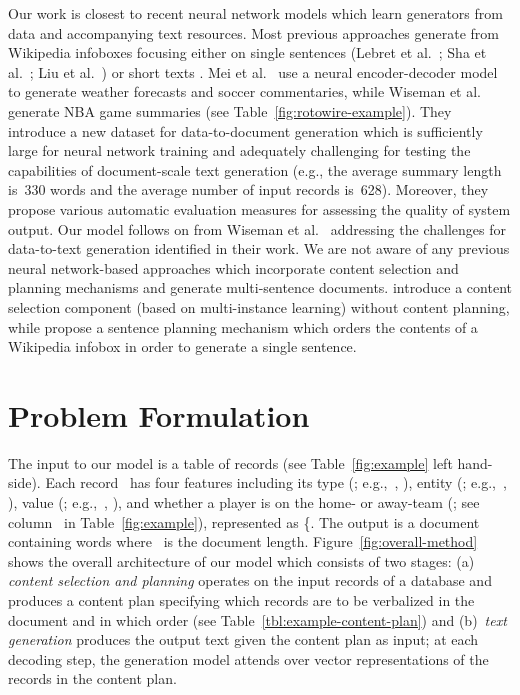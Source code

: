\documentclass[letterpaper]{article} \usepackage{aaai19}  \usepackage{times}  \usepackage{helvet}  \usepackage{courier}  \usepackage{url}  \usepackage{graphicx}  \frenchspacing  \setlength{\pdfpagewidth}{8.5in}  \setlength{\pdfpageheight}{11in}  \graphicspath{ {images/} }
\newcommand{\lform}[1]{\textsf{\fontsize{7.5pt}{.1pt}\selectfont{#1}}}
\begin{document}
Our work is closest to recent neural network models which learn
generators from data and accompanying text resources. Most previous
approaches generate from Wikipedia infoboxes focusing either on single
sentences (Lebret et al.~\citeyear{D16-1128,E17-1060}; Sha et
al.~\citeyear{sha2017order}; Liu et al.~\citeyear{liu2017table}) or
short texts \cite{perez2018bootstrapping}.  Mei et
al.~ use a neural encoder-decoder model to
generate weather forecasts and soccer commentaries, while Wiseman et
al.~ generate NBA game summaries (see
Table~\ref{fig:rotowire-example}). They introduce a new dataset for
data-to-document generation which is sufficiently large for neural
network training and adequately challenging for testing the
capabilities of document-scale text generation (e.g., the average
summary length is~330 words and the average number of input records
is~628). Moreover, they propose various automatic evaluation measures
for assessing the quality of system output. Our model follows on from
Wiseman et al.~ addressing the
challenges for data-to-text generation identified in their work.  We
are not aware of any previous neural network-based approaches which
incorporate content selection and planning mechanisms and generate
multi-sentence documents. \citeauthor{perez2018bootstrapping}
 introduce a content selection
component (based on multi-instance learning) without content planning,
while \citeauthor{liu2017table}  propose a
sentence planning mechanism which orders the contents of a Wikipedia
infobox in order to generate a single sentence.



\section{Problem Formulation}

The input to our model is a table of records (see
Table~\ref{fig:example} left hand-side). Each record~ has four
features including its type (; e.g.,~\lform{\small LOSS},
\lform{\small CITY}), entity (; e.g.,~\lform{\small Pacers},
\lform{\small Miles Turner}), value (; e.g.,~\lform{\small
  11}, \lform{\small Indiana}), and whether a player is on the home-
or away-team (; see column~\lform{\small H/V} in
Table~\ref{fig:example}), represented as \{. The
output  is a document containing words 
where ~is the document length.  Figure~\ref{fig:overall-method}
shows the overall architecture of our model which consists of two
stages: (a) \emph{content selection and planning} operates on the input
records of a database and produces a content plan specifying which
records are to be verbalized in the document and in which order (see
Table~\ref{tbl:example-content-plan}) and (b)~\emph{text generation}
produces the output text given the content plan as input; at each
decoding step, the generation model attends over vector
representations of the records in the content plan.
\end{document}
